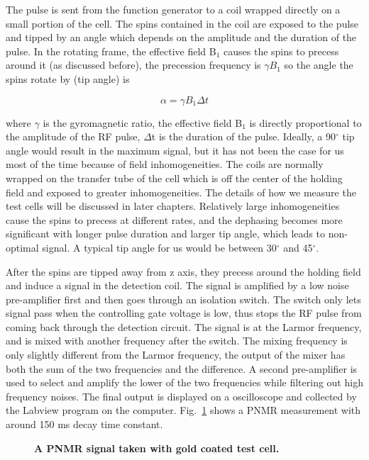 The pulse is sent from the function generator to a coil wrapped directly on a small portion of the cell. The spins contained in the coil are exposed to the pulse and tipped by an angle which depends on the amplitude and the duration of the pulse. In the rotating frame, the effective field B$_{1}$ causes the spins to precess around it (as discussed before), the precession frequency is $\gamma B_{1}$ so the angle the spins rotate by (tip angle) is  

\begin{equation}\label{tip_angle}
\alpha = \gamma B_{1} \Delta t
\end{equation}

where $\gamma$ is the gyromagnetic ratio, the effective field B$_{1}$ is directly proportional to the amplitude of the RF pulse, $\Delta$t is the duration of the pulse. Ideally, a 90$^{\circ}$ tip angle would result in the maximum signal, but it has not been the case for us most of the time because of field inhomogeneities. The coils are normally wrapped on the transfer tube of the cell which is off the center of the holding field and exposed to greater inhomogeneities. The details of how we measure the test cells will be discussed in later chapters. Relatively large inhomogeneities cause the spins to precess at different rates, and the dephasing becomes more significant with longer pulse duration and larger tip angle, which leads to non-optimal signal. A typical tip angle for us would be between 30$^{\circ}$ and 45$^{\circ}$. 

After the spins are tipped away from z axis, they precess around the holding field and induce a signal in the detection coil. The signal is amplified by a low noise pre-amplifier first and then goes through an isolation switch. The switch only lets signal pass when the controlling gate voltage is low, thus stops the RF pulse from coming back through the detection circuit. The signal is at the Larmor frequency, and is mixed with another frequency after the switch. The mixing frequency is only slightly different from the Larmor frequency, the output of the mixer has both the sum of the two frequencies and the difference. A second pre-amplifier is used to select and amplify the lower of the two frequencies while filtering out high frequency noises. The final output is displayed on a oscilloscope and collected by the Labview program on the computer. Fig.~\ref{FID} shows a PNMR measurement with around 150 ms decay time constant.

\begin{figure}[H]
	\centering
	\caption{{\bf A PNMR signal taken with gold coated test cell.}}
	\label{FID}
\end{figure}

